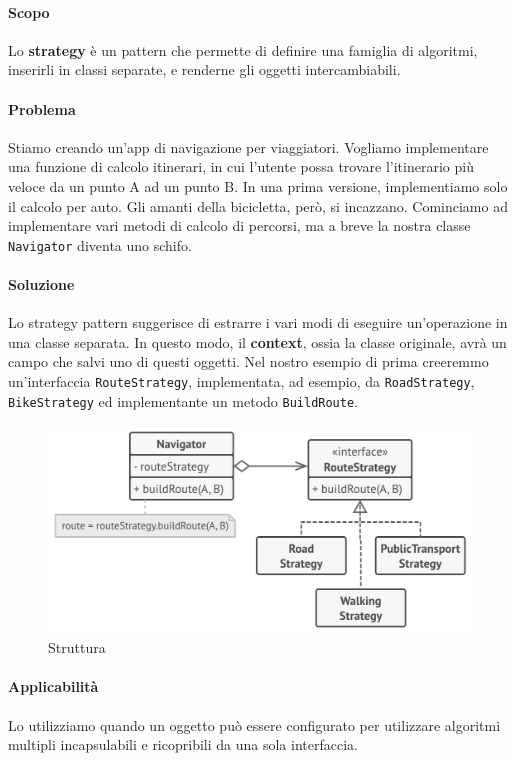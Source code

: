 \documentclass[11pt]{article}
\newcommand{\code}[1]{\texttt{#1}}
\begin{document}
\paragraph{Scopo}
Lo \textbf{strategy} è un pattern che permette di definire una famiglia di algoritmi, inserirli in classi separate, e renderne gli oggetti intercambiabili. 
\paragraph{Problema}
Stiamo creando un'app di navigazione per viaggiatori. Vogliamo implementare una funzione di calcolo itinerari, in cui l'utente possa trovare l'itinerario più veloce da un punto A ad un punto B. In una prima versione, implementiamo solo il calcolo per auto. Gli amanti della bicicletta, però, si incazzano. Cominciamo ad implementare vari metodi di calcolo di percorsi, ma a breve la nostra classe \code{Navigator} diventa uno schifo. 
\paragraph{Soluzione}
Lo strategy pattern suggerisce di estrarre i vari modi di eseguire un'operazione in una classe separata. In questo modo, il \textbf{context}, ossia la classe originale, avrà un campo che salvi uno di questi oggetti. Nel nostro esempio di prima creeremmo un'interfaccia \code{RouteStrategy}, implementata, ad esempio, da \code{RoadStrategy}, \code{BikeStrategy} ed implementante un metodo \code{BuildRoute}. 
\begin{figure}[H]
    \includegraphics[width=\linewidth]{res/teoria/Strategy.png}
    \caption{Struttura}
\end{figure}
\paragraph{Applicabilità}
Lo utilizziamo quando un oggetto può essere configurato per utilizzare algoritmi multipli incapsulabili e ricopribili da una sola interfaccia.
\end{document}
